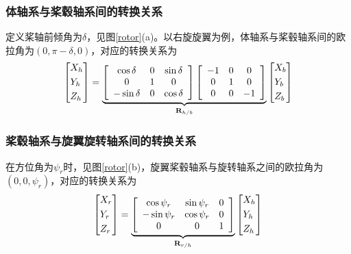 \subsubsection{体轴系与桨毂轴系间的转换关系}
定义桨轴前倾角为$\delta$，见图\ref{rotor}(a)。以右旋旋翼为例，体轴系与桨毂轴系间的欧拉角为$(0, \pi-\delta, 0)$，对应的转换关系为
\begin{equation}
  \left[ \begin{gathered}
    {X_h} \hfill \\
    {Y_h} \hfill \\
    {Z_h} \hfill \\ 
  \end{gathered}  \right] = \underbrace {\left[ {\begin{array}{*{20}{c}}
    {\cos \delta }&0&{\sin \delta } \\ 
    0&1&0 \\ 
    { - \sin \delta }&0&{\cos \delta } 
  \end{array}} \right]\left[ {\begin{array}{*{20}{c}}
    { - 1}&0&0 \\ 
    0&1&0 \\ 
    0&0&{ - 1} 
  \end{array}} \right]}_{{{\mathbf{R}}_{h/b}}}\left[ \begin{gathered}
    {X_b} \hfill \\
    {Y_b} \hfill \\
    {Z_b} \hfill \\ 
  \end{gathered}  \right]
\end{equation}
\subsubsection{桨毂轴系与旋翼旋转轴系间的转换关系}
在方位角为$\psi_r$时，见图\ref{rotor}(b)，旋翼桨毂轴系与旋转轴系之间的欧拉角为$(0, 0, \psi_r)$，对应的转换关系为
\begin{equation}
  \left[ \begin{gathered}
    {X_{r}} \hfill \\
    {Y_{r}} \hfill \\
    {Z_{r}} \hfill \\ 
  \end{gathered}  \right] = \underbrace {\left[ {\begin{array}{*{20}{c}}
    \cos \psi_r&\sin \psi_r&0 \\ 
    -\sin \psi_r&\cos \psi_r&0 \\ 
    0&0&1
  \end{array}} \right]}_{{{\mathbf{R}}_{r/h}}}\left[ \begin{gathered}
    {X_h} \hfill \\
    {Y_h} \hfill \\
    {Z_h} \hfill \\ 
  \end{gathered}  \right]
\end{equation}

